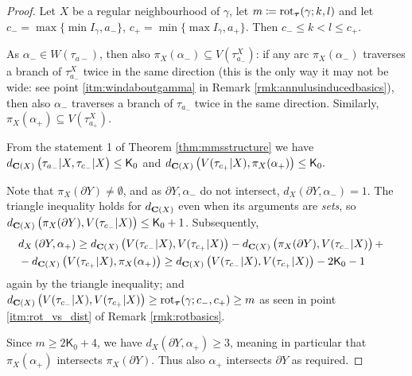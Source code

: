 \begin{proof}
Let $X$ be a regular neighbourhood of $\gamma$, let $m\coloneqq \mathrm{rot}_{\bm\tau}(\gamma;k,l)$ and let $c_-=\max\{\min I_\gamma,a_-\}$, $c_+=\min\{\max I_\gamma,a_+\}$. Then $c_-\leq k < l \leq c_+$.

As $\alpha_-\in W(\tau_{a-})$, then also $\pi_X(\alpha_-)\subseteq V(\tau_{a_-}^X)$: if any arc $\pi_X(\alpha_-)$ traverses a branch of $\tau_{a_-}^X$ twice in the same direction (this is the only way it may not be wide: see point \ref{itm:windaboutgamma} in Remark \ref{rmk:annulusinducedbasics}), then also $\alpha_-$ traverses a branch of $\tau_{a_-}$ twice in the same direction. Similarly, $\pi_X(\alpha_+)\subseteq V(\tau_{a_+}^X)$.%

From the statement 1 of Theorem \ref{thm:mmsstructure} we have $d_{\mathbf C(X)}\left(\tau_{a_-}|X, \tau_{c_-}|X\right)\leq \mathsf{K}_0$ and $d_{\mathbf C(X)}\left(V(\tau_{c_+}|X), \pi_X(\alpha_+)\right)\leq \mathsf{K}_0.$

Note that $\pi_X(\partial Y)\not=\emptyset$, and as $\partial Y,\alpha_-$ do not intersect, $d_X(\partial Y,\alpha_-)=1$. The triangle inequality holds for $d_{\mathbf C(X)}$ even when its arguments are \emph{sets}, so\linebreak $d_{\mathbf C(X)}\left(\pi_X(\partial Y), V(\tau_{c_-}|X)\right)\leq \mathsf{K}_0+1$. Subsequently,
\begin{eqnarray*}
 & d_X\left(\partial Y,\alpha_+\right) \geq d_{\mathbf C(X)}\left(V(\tau_{c_-}|X),V(\tau_{c_+}|X)\right)- d_{\mathbf C(X)}\left(\pi_X(\partial Y), V(\tau_{c_-}|X)\right) + & \\
 & - d_{\mathbf C(X)}\left(V(\tau_{c_+}|X), \pi_X(\alpha_+)\right) \geq d_{\mathbf C(X)}\left(V(\tau_{c_-}|X),V(\tau_{c_+}|X)\right)-2\mathsf{K}_0-1 & 
\end{eqnarray*}
again by the triangle inequality; and $d_{\mathbf C(X)}\left(V(\tau_{c_-}|X),V(\tau_{c_+}|X)\right)\geq \mathrm{rot}_{\bm\tau}(\gamma;c_-,c_+)\geq m$ as seen in point \ref{itm:rot_vs_dist} of Remark \ref{rmk:rotbasics}.

Since $m\geq 2\mathsf{K}_0+4$, we have $d_X\left(\partial Y,\alpha_+\right)\geq 3$, meaning in particular that $\pi_X(\alpha_+)$ intersects $\pi_X(\partial Y)$. Thus also $\alpha_+$ intersects $\partial Y$ as required.
\end{proof}

